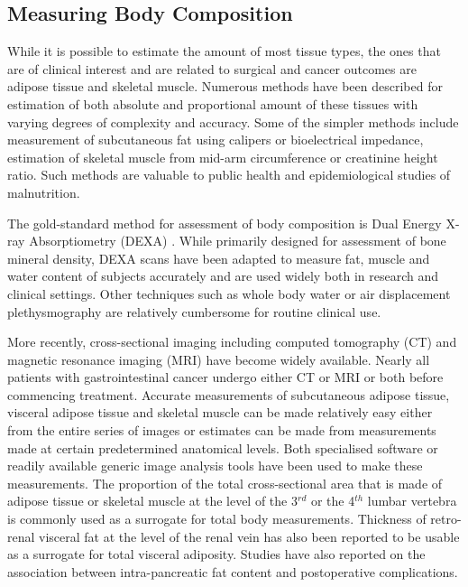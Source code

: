 \subsection{Measuring Body Composition}
While it is possible to estimate the amount of most tissue types, the ones that are of clinical interest and are related to surgical and cancer outcomes are adipose tissue and skeletal muscle. 
Numerous methods have been described for estimation of both absolute and proportional amount of these tissues with varying degrees of complexity and accuracy. 
Some of the simpler methods include measurement of subcutaneous fat using calipers or bioelectrical impedance, estimation of skeletal muscle from mid-arm circumference or creatinine height ratio. 
Such methods are valuable to public health and epidemiological studies of malnutrition. 

The gold-standard method for assessment of body composition is Dual Energy X-ray Absorptiometry (DEXA) \parencite{haarbo_validation_1991}. 
While primarily designed for assessment of bone mineral density, DEXA scans have been adapted to measure fat, muscle and water content of subjects accurately and are used widely both in research and clinical settings. 
Other techniques such as whole body water or air displacement plethysmography are relatively cumbersome for routine clinical use.

More recently, cross-sectional imaging including computed tomography (CT) and magnetic resonance imaging (MRI) have become widely available. 
Nearly all patients with gastrointestinal cancer undergo either CT or MRI or both before commencing treatment. 
Accurate measurements of subcutaneous adipose tissue, visceral adipose tissue and skeletal muscle can be made relatively easy either from the entire series of images or estimates can be made from measurements made at certain predetermined anatomical levels. 
Both specialised software or readily available generic image analysis tools have been used to make these measurements. 
The proportion of the total cross-sectional area that is made of adipose tissue or skeletal muscle at the level of the 3$^{rd}$ or the 4$^{th}$ lumbar vertebra is commonly used as a surrogate for total body measurements. 
Thickness of retro-renal visceral fat at the level of the renal vein has also been reported to be usable as a surrogate for total visceral adiposity. 
Studies have also reported on the association between intra-pancreatic fat content and postoperative complications.









